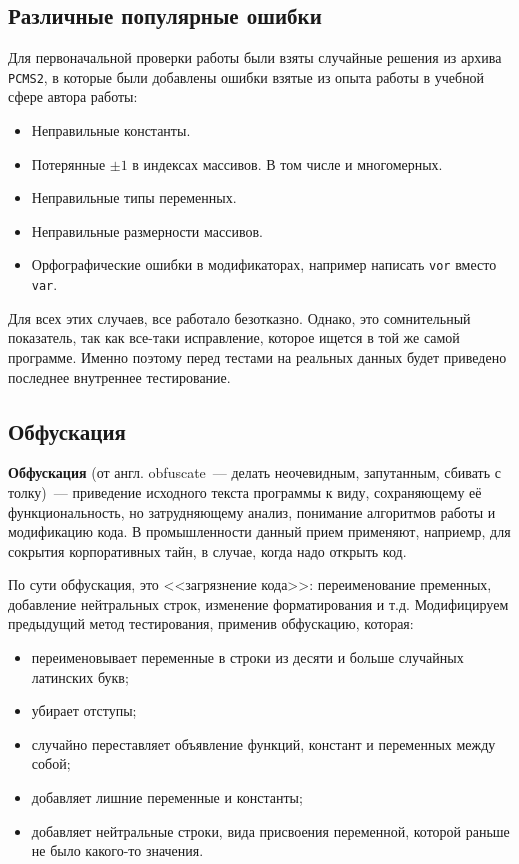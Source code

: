 \subsection{Различные популярные ошибки}
Для первоначальной проверки работы были взяты случайные решения из архива \texttt{PCMS2}, в которые были добавлены ошибки взятые из
опыта работы в учебной сфере автора работы:
\begin{itemize}
    \item Неправильные константы.
    \item Потерянные $\pm 1$ в индексах массивов. В том числе и многомерных.
    \item Неправильные типы переменных.
    \item Неправильные размерности массивов.
    \item Орфографические ошибки в модификаторах, например написать \texttt{vor} вместо \texttt{var}.
\end{itemize} 
Для всех этих случаев, все работало безотказно. Однако, это сомнительный показатель, так как все-таки исправление, которое ищется
в той же самой программе. Именно поэтому перед тестами на реальных данных будет приведено последнее внутреннее тестирование. 
\subsection{Обфускация}
\textbf{Обфускация} (от англ. obfuscate~--- делать неочевидным, запутанным, сбивать с толку)~--- приведение исходного текста 
программы к виду, сохраняющему её функциональность, но затрудняющему анализ, понимание алгоритмов работы и модификацию кода. 
В промышленности данный прием применяют, наприемр, для сокрытия корпоративных тайн, в случае, когда надо открыть код.

По сути обфускация, это <<загрязнение кода>>: переименование пременных, добавление нейтральных строк, изменение форматирования
и т.д. Модифицируем предыдущий метод тестирования, применив обфускацию, которая:
\begin{itemize}
    \item переименовывает переменные в строки из десяти и больше случайных латинских букв;
    \item убирает отступы;
    \item случайно переставляет объявление функций, констант и переменных между собой;
    \item добавляет лишние переменные и константы;
    \item добавляет нейтральные строки, вида присвоения переменной, которой раньше не было какого-то значения.
\end{itemize} 

